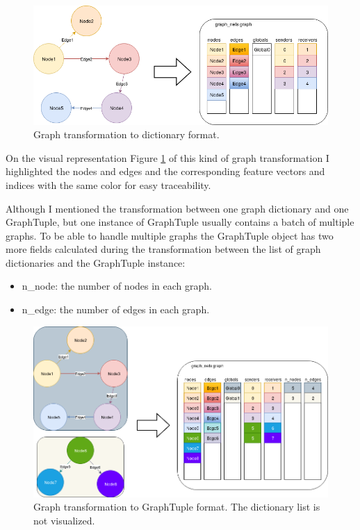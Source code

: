 \begin{figure}[!ht]
	\centering
	\includegraphics[width=150mm, keepaspectratio]{figures/transform_color.png}
	\caption{Graph transformation to dictionary format.}
	\label{fig:transform_graph}
\end{figure}

On the visual representation Figure \ref{fig:transform_graph} of this kind of graph transformation I highlighted the nodes and edges and the corresponding feature vectors and indices with the same color for easy traceability.
\FloatBarrier

Although I mentioned the transformation between one graph dictionary and one GraphTuple, but one instance of GraphTuple usually contains a batch of multiple graphs. To be able to handle multiple graphs the GraphTuple object has two more fields calculated during the transformation between the list of graph dictionaries and the GraphTuple instance:
\begin{itemize}
	\item n\_node: the number of nodes in each graph.
	\item n\_edge: the number of edges in each graph.
\end{itemize}

\begin{figure}[!ht]
	\centering
	\includegraphics[width=150mm, keepaspectratio]{figures/transform_multiple.png}
	\caption{Graph transformation to GraphTuple format. The dictionary list is not visualized.}
	\label{fig:transform_multiple}
\end{figure}

